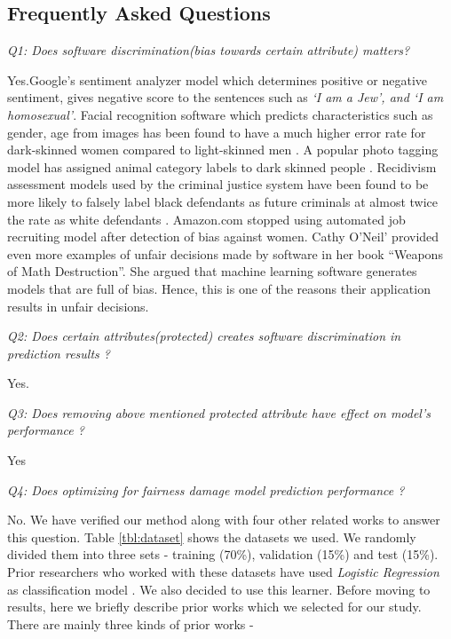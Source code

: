 \documentclass{NSF}
\begin{document}
\begin{nsfdescription}
\section{Frequently Asked Questions}\label{tion:faq}
{\em Q1: Does software discrimination(bias towards certain attribute) matters?}

Yes.Google's sentiment analyzer model which determines positive or negative sentiment, gives negative score to the sentences such as \textit{`I am a Jew', and `I am homosexual'}\cite{Google_Sentiment}. Facial recognition software which predicts characteristics such as gender, age from images has been found to have a much higher error rate for dark-skinned women compared to light-skinned men \cite{Gender_Bias}. A popular photo tagging model has assigned animal category labels to dark skinned people \cite{Google_Photo}. Recidivism assessment models used by the criminal justice system have been found to be more likely to falsely label black defendants as future criminals at almost twice the rate as white defendants \cite{Machine_Bias}. Amazon.com stopped using automated job recruiting model after detection of bias against women\cite{Amazon_Bias}. Cathy O'Neil’ provided even more examples of unfair decisions made by software in her book ``Weapons of Math Destruction''\cite{O'Neil:2016:WMD:3002861}. She argued that machine learning software generates models that are full of bias. Hence, this is one of the reasons their application results in unfair decisions.

{\em Q2: Does certain attributes(protected) creates software  discrimination in prediction results ?}

Yes.

{\em Q3: Does removing above mentioned protected attribute have effect on model's performance ?}

Yes

{\em Q4: Does optimizing for fairness damage model prediction performance ?}

No. We have verified our method along with four other related works to answer this question. Table \ref{tbl:dataset} shows the datasets we used. We randomly divided them into three sets - training (70\%), validation (15\%) and test (15\%). Prior researchers who worked with these datasets have used \textit{Logistic Regression} as classification model \cite{Kamishima,NIPS2017_6988,Hardt}. We also decided to use this learner. Before moving to results, here we briefly describe prior works which we selected for our study. There are mainly three kinds of prior works -


\end{nsfdescription}
\end{document}
